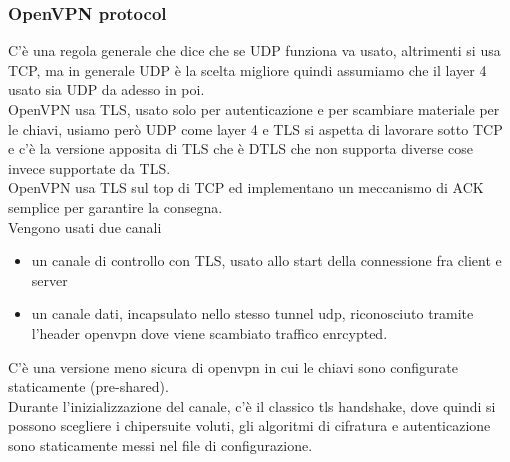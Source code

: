 \documentclass[12pt, oneside]{extbook} %
\begin{document}
\subsubsection{OpenVPN protocol}
C'è una regola generale che dice che se UDP funziona va usato, altrimenti si usa TCP, ma in generale UDP è la scelta migliore quindi assumiamo che il layer 4 usato sia UDP da adesso in poi.
\\OpenVPN usa TLS, usato solo per autenticazione e per scambiare materiale per le chiavi, usiamo però UDP come layer 4 e TLS si aspetta di lavorare sotto TCP e c'è la versione apposita di TLS che è DTLS che non supporta diverse cose invece supportate da TLS.
\\OpenVPN usa TLS sul top di TCP ed implementano un meccanismo di ACK semplice per garantire la consegna.
\\Vengono usati due canali
\begin{itemize}
    \item un canale di controllo con TLS, usato allo start della connessione fra client e server
    \item un canale dati, incapsulato nello stesso tunnel udp, riconosciuto tramite l'header openvpn dove viene scambiato traffico enrcypted.
\end{itemize}
C'è una versione meno sicura di openvpn in cui le chiavi sono configurate staticamente (pre-shared).
\\Durante l'inizializzazione del canale, c'è il classico tls handshake, dove quindi si possono scegliere i chipersuite voluti, gli algoritmi di cifratura e autenticazione sono staticamente messi nel file di configurazione.
\end{document}
